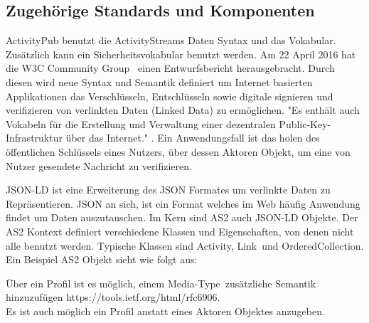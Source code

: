 		
	
	\subsection{Zugehörige Standards und Komponenten}
		ActivityPub benutzt die ActivityStreams Daten Syntax und das Vokabular. Zusätzlich kann ein Sicherheitsvokabular benutzt werden. Am 22 April 2016 hat die \glqq W3C Community Group\grqq~ einen Entwurfsbericht herausgebracht. Durch diesen wird neue Syntax und Semantik definiert um Internet basierten Applikationen das Verschlüsseln, Entschlüsseln sowie digitale signieren und verifizieren von verlinkten Daten (Linked Data) zu ermöglichen. "Es enthält auch Vokabeln für die Erstellung und Verwaltung einer dezentralen Public-Key-Infrastruktur über das Internet." \cite{security-vocab-linked-data}. Ein Anwendungsfall ist das holen des öffentlichen Schlüssels eines Nutzers, über dessen Aktoren Objekt, um eine von Nutzer gesendete Nachricht zu verifizieren.
		
		\gls{JSON-LD} ist eine Erweiterung des JSON Formates um verlinkte Daten zu Repräsentieren. JSON an sich, ist ein Format welches im Web häufig Anwendung findet um Daten auszutauschen. Im Kern sind \gls{AS2} auch \gls{JSON-LD} Objekte. Der \gls{AS2} Kontext definiert verschiedene Klassen und Eigenschaften, von denen nicht alle benutzt werden. Typische Klassen sind \glqq Activity\grqq, \glqq Link\grqq~und \glqq OrderedCollection\grqq. Ein Beispiel \gls{AS2} Objekt sieht wie folgt aus: 	
		
		
		Über ein Profil ist es möglich, einem \glqq Media-Type\grqq~zusätzliche Semantik hinzuzufügen https://tools.ietf.org/html/rfc6906.\\
		
		Es ist auch möglich ein Profil anstatt eines Aktoren Objektes anzugeben.
		
